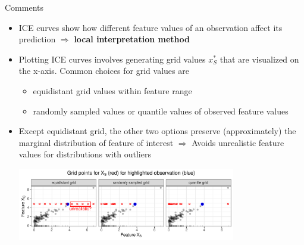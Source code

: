 \documentclass[11pt,compress,t,notes=noshow, aspectratio=169, xcolor=table]{beamer}
\begin{document}
\begin{frame}{Comments}
\begin{itemize}
\item ICE curves show how different feature values of an observation affect its prediction \newline $\Rightarrow$ \textbf{local interpretation method}
\item Plotting ICE curves involves generating grid values $x_S^*$ that are visualized on the x-axis.
Common choices for grid values are
\begin{itemize}
\item equidistant grid values within feature range
\item randomly sampled values or quantile values of observed feature values
\end{itemize}
\item Except equidistant grid, the other two options preserve (approximately) the marginal distribution of feature of interest
$\Rightarrow$ Avoids unrealistic feature values for distributions with outliers

\vspace{3pt}
\centering
\includegraphics[width=0.75\textwidth, trim=0cm 0cm 0cm 0cm, clip]{figure/sampling}

\end{itemize}
\end{frame}

\endlecture
\end{document}
